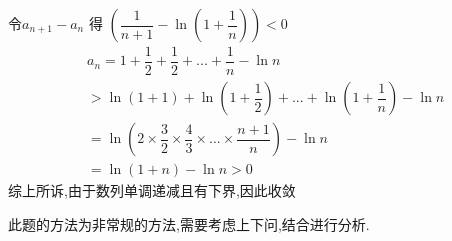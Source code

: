 \documentclass[8pt a4paper, oneside, UTF8]{ctexbook}
\begin{document}
\begin{sloppypar}
\begin{problem}
    \end{problem}
    \begin{solution}
        令$a_{n+1}-a_n$ 得 $(\dfrac{1}{n+1}-\ln(1+\dfrac{1}{n}))<0$
        \begin{align*}
             & a_n= 1+\dfrac{1}{2}+\dfrac{1}{2}+...+\dfrac{1}{n}-\ln n                                \\
             & > \ln(1+1)+\ln(1+\dfrac{1}{2})+...+\ln(1+\dfrac{1}{n})-\ln n                           \\
             & =\ln(2 \times \dfrac{3}{2} \times \dfrac{4}{3} \times ... \times \dfrac{n+1}{n})-\ln n \\
             & = \ln(1+n)-\ln n >0
        \end{align*}
        综上所诉,由于数列单调递减且有下界,因此收敛
    \end{solution}
    \begin{note}
        此题的方法为非常规的方法,需要考虑上下问,结合进行分析.
    \end{note}

\end{sloppypar}
\end{document}
